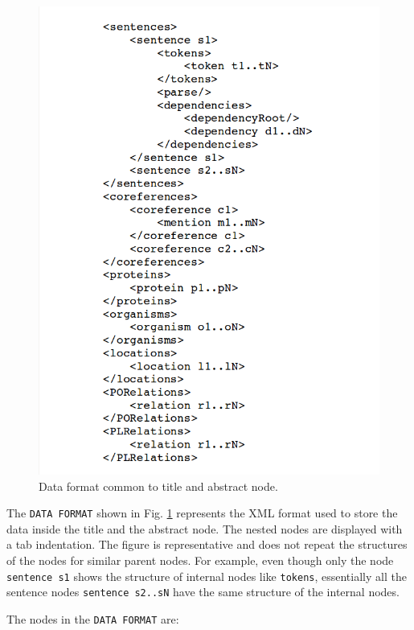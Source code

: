 \begin{enumerate}
\begin{figure}
\centering
\includegraphics[scale=0.4]{figures/XMLSchema2.png}
\caption{Data format common to title and abstract node.}\label{fig:XMLSchema2}
\end{figure}

The \texttt{DATA FORMAT} shown in Fig. \ref{fig:XMLSchema2} represents the XML format used to store the data inside the title and the abstract node. The nested nodes are displayed with a tab indentation. The figure is representative and does not repeat the structures of the nodes for similar parent nodes. For example, even though only the node \texttt{sentence s1} shows the structure of internal nodes like \texttt{tokens}, essentially all the sentence nodes \texttt{sentence s2..sN} have the same structure of the internal nodes.

The nodes in the \texttt{DATA FORMAT} are:


\end{enumerate}
